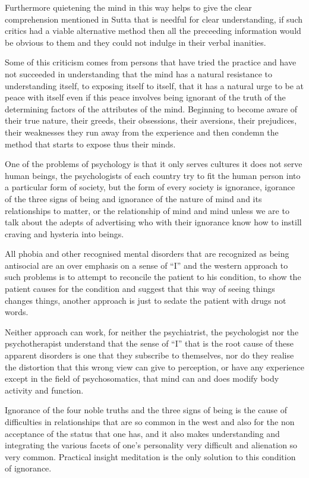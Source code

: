 \documentclass[a5paper,10pt,english]{book}
\begin{document}
\sphinxAtStartPar
Furthermore quietening the mind in this way helps to give the clear comprehension mentioned in Sutta that is needful for clear understanding, if such critics had a viable alternative method then all the preceeding information would be obvious to them and they could not indulge in their verbal inanities.

\sphinxAtStartPar
Some of this criticism comes from persons that have tried the practice and have not succeeded in understanding that the mind has a natural resistance to understanding itself, to exposing itself to itself, that it has a natural urge to be at peace with itself even if this peace involves being ignorant of the truth of the determining factors of the attributes of the mind. Beginning to become aware of their true nature, their greeds, their obsessions, their aversions, their prejudices, their weaknesses they run away from the experience and then condemn the method that starts to expose thus their minds.

\sphinxAtStartPar
One of the problems of psychology is that it only serves cultures it does not serve human beings, the psychologists of each country try to fit the human person into a particular form of society, but the form of every society is ignorance, igorance of the three signs of being and ignorance of the nature of mind and its relationships to matter, or the relationship of mind and mind unless we are to talk about the adepts of advertising who with their ignorance know how to instill craving and hysteria into beings.

\sphinxAtStartPar
All phobia and other recognised mental disorders that are recognized as being antisocial are an over emphasis on a sense of “I” and the western approach to such problems is to attempt to reconcile the patient to his condition, to show the patient causes for the condition and suggest that this way of seeing things changes things, another approach is just to sedate the patient with drugs not words.

\sphinxAtStartPar
Neither approach can work, for neither the psychiatrist, the psychologist nor the psychotherapist understand that the sense of “I” that is the root cause of these apparent disorders is one that they subscribe to themselves, nor do they realise the distortion that this wrong view can give to perception, or have any experience except in the field of psychosomatics, that mind can and does modify body activity and function.

\sphinxAtStartPar
Ignorance of the four noble truths and the three signs of being is the cause of difficulties in relationships that are so common in the west and also for the non acceptance of the status that one has, and it also makes understanding and integrating the various facets of one’s personality very difficult and alienation so very common. Practical insight meditation is the only solution to this condition of ignorance.
\end{document}
